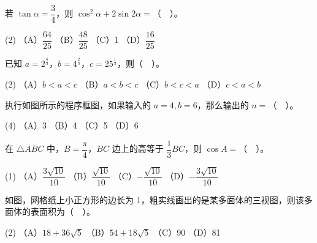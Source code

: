 \begin{question}
若 \(\tan\alpha=\dfrac34\)，则 \(\cos^2\alpha+2\sin 2\alpha=\)（　）。

\begin{gkopts}(2)
\task （A）\(\dfrac{64}{25}\)
\task （B）\(\dfrac{48}{25}\)
\task （C）1
\task （D）\(\dfrac{16}{25}\)
\end{gkopts}

\end{question}
\begin{question}
已知 \(a=2^{\frac43}\)，\(b=4^{\frac25}\)，\(c=25^{\frac13}\)，则（　）。

\begin{gkopts}(2)
\task （A）\(b<a<c\)
\task （B）\(a<b<c\)
\task （C）\(b<c<a\)
\task （D）\(c<a<b\)
\end{gkopts}

\Needspace{0.4\textheight}
\end{question}
\begin{question}
执行如图所示的程序框图，如果输入的 \(a=4,b=6\)，那么输出的 \(n=\)（　）。

\begin{gkopts}(4)
\task （A）3
\task （B）4
\task （C）5
\task （D）6
\end{gkopts}
\nopagebreak[4]
\begin{center}\end{center}
\nopagebreak[4]
\end{question}
\begin{question}
在 \(\triangle ABC\) 中，\(B=\dfrac\pi4\)，\(BC\) 边上的高等于 \(\dfrac13BC\)，则 \(\cos A=\)（　）。

\begin{gkopts}(1)
\task （A）\(\dfrac{3\sqrt{10}}{10}\)
\task （B）\(\dfrac{\sqrt{10}}{10}\)
\task （C）\(-\dfrac{\sqrt{10}}{10}\)
\task （D）\(-\dfrac{3\sqrt{10}}{10}\)
\end{gkopts}

\Needspace{0.4\textheight}
\end{question}
\begin{question}
如图，网格纸上小正方形的边长为 1，粗实线画出的是某多面体的三视图，则该多面体的表面积为（　）。

\begin{gkopts}(2)
\task （A）\(18+36\sqrt5\)
\task （B）\(54+18\sqrt5\)
\task （C）90
\task （D）81
\end{gkopts}
\nopagebreak[4]
\begin{center}\end{center}
\nopagebreak[4]
\end{question}
